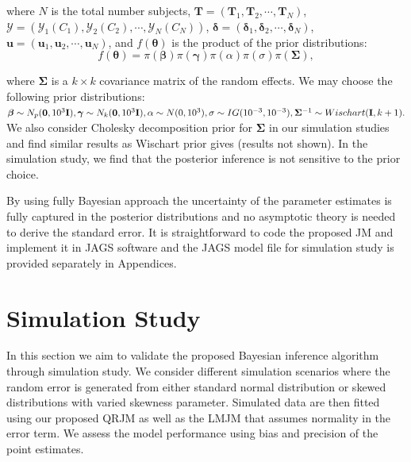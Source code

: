 \noindent where $N$ is the total number subjects, $\boldsymbol{T}=(\boldsymbol{T}_1, \boldsymbol{T}_2, \cdots, \boldsymbol{T}_N)$, $\bm{\mathcal{Y}}=(\mathcal{Y}_{1}(C_1), \mathcal{Y}_{2}(C_2), \cdots, \mathcal{Y}_{N}(C_N))$, $\boldsymbol{\delta} =(\boldsymbol{\delta}_1, \boldsymbol{\delta}_2, \cdots, \boldsymbol{\delta}_N)$, $\boldsymbol{u}=(\boldsymbol{u}_1, \boldsymbol{u}_2, \cdots, \boldsymbol{u}_N)$, and $f(\boldsymbol{\theta})$ is the product of the prior distributions:
\[f(\boldsymbol{\theta})=\pi(\boldsymbol{\beta})\pi(\boldsymbol{\gamma})\pi(\alpha)\pi(\sigma)\pi(\boldsymbol{\Sigma}),\]

\noindent where $\boldsymbol{\Sigma}$ is a $k\times k$ covariance matrix of the random effects. We may choose the following prior distributions:
$\boldsymbol{\beta} \sim N_p({\boldsymbol 0}, 10^3{\bf I}), \boldsymbol{\gamma} \sim N_k({\boldsymbol 0}, 10^3{\bf I}), \alpha\sim N(0, 10^3), \sigma\sim IG(10^{-3}, 10^{-3}), \boldsymbol{\Sigma}^{-1}\sim Wischart({\bf I}, k+1). $
We also consider Cholesky decomposition prior for $\boldsymbol{\Sigma}$ in our simulation studies and find similar results as Wischart prior gives (results not shown). In the simulation study, we find that the posterior inference is not sensitive to the prior choice.

By using fully Bayesian approach the uncertainty of the parameter estimates is fully captured in the posterior distributions and no asymptotic theory is needed to derive the standard error. It is straightforward to code the proposed JM and implement it in \textsf{JAGS} software \citep{plummer2003jags} and the \textsf{JAGS} model file for simulation study is provided separately in Appendices.


\section{Simulation Study} \label{sec:p2simulation}
In this section we aim to validate the proposed Bayesian inference algorithm through simulation study. We consider different simulation scenarios where the random error is generated from either standard normal distribution or skewed distributions with varied skewness parameter. Simulated data are then fitted using our proposed QRJM as well as the LMJM that assumes normality in the error term. We assess the model performance using bias and precision of the point estimates.

